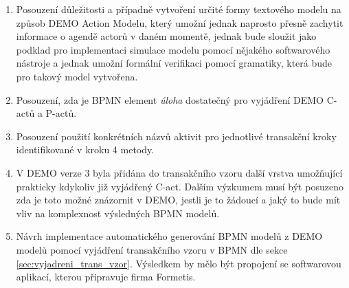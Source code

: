\begin{enumerate}
\item Posouzení důležitosti a případně vytvoření určité formy textového modelu na způsob DEMO Action Modelu, který umožní jednak naprosto přesně zachytit informace o agendě actorů v daném momentě, jednak bude sloužit jako podklad pro implementaci simulace modelu pomocí nějakého softwarového nástroje a jednak umožní formální verifikaci pomocí gramatiky, která bude pro takový model vytvořena.
\item Posouzení, zda je BPMN element \textit{úloha} dostatečný pro vyjádření DEMO C-actů a P-actů.
\item Posouzení použití konkrétních názvů aktivit pro jednotlivé transakční kroky identifikované v kroku 4 metody.
\item V DEMO verze 3 byla přidána do transakčního vzoru další vrstva umožňující prakticky kdykoliv  již vyjádřený C-act. Dalším výzkumem musí být posuzeno zda je toto možné znázornit v DEMO, jestli je to žádoucí a jaký to bude mít vliv na komplexnost výsledných BPMN modelů.
\item Návrh implementace automatického generování BPMN modelů z DEMO modelů pomocí vyjádření transakčního vzoru v BPMN dle sekce \ref{sec:vyjadreni_trans_vzor}. Výsledkem by mělo být propojení se softwarovou aplikací, kterou připravuje firma Formetis.
\end{enumerate}
